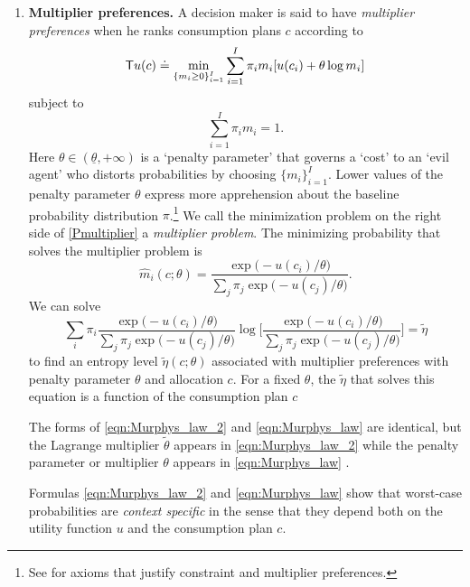 \begin{enumerate}
\item\textbf{Multiplier preferences.}  A decision maker is said to have \textit{multiplier preferences} when he ranks consumption plans $c$
according to
\begin{equation}\label{Pmultiplier}
{\sf T}u(c) \doteq \min_{\{m_i \geq 0\}_{i=1}^I}  \sum_{i=1}^I \pi_i m_i [  u(c_i) + \theta \log m_i ] \end{equation}
subject to
\[ \sum_{i=1}^I \pi_i m_i = 1 .\]
Here $\theta \in (\underline \theta, +\infty )$ is a  `penalty parameter' that governs a `cost' to an `evil agent' who distorts probabilities by
 choosing $\{m_i\}_{i=1}^I$.  %
 Lower
values of the penalty parameter $\theta$ express more apprehension about  the baseline probability distribution $\pi$.\footnote{See
\citet{CMMM2008} for axioms that justify  constraint and multiplier preferences.}
We call the minimization problem  on the right side of \eqref{Pmultiplier}   a \textit{multiplier problem}. 
The minimizing probability that solves  the multiplier problem  is
 \begin{equation}\label{eqn:Murphys_law} \hat m_i(c; \theta) = \frac{ \exp \bigl(- u(c_i)/\theta\bigr)}{\sum_j \pi_j \exp \bigl(- u(c_j)/\theta\bigr) } .\end{equation}
 We can  solve
\begin{equation}\label{eqn:entropy_grand_2}
\sum_i \pi_i \frac{ \exp \bigl(- u(c_i)/ \theta\bigr)}{\sum_j \pi_j \exp \bigl(- u(c_j)/ \theta\bigr) }
\log \biggl[\frac{ \exp \bigl(- u(c_i)/\theta\bigr)}{\sum_j \pi_j \exp \bigl(- u(c_j)/\theta\bigr) }
\biggr] = \tilde \eta  \end{equation} to find an entropy level $\tilde \eta (c; \theta)$  associated with multiplier preferences
with penalty parameter $\theta$ and allocation $c$.
For a fixed $\theta$, the $\tilde \eta$ that solves this equation is a function of the consumption
plan $c$
\begin{remark}
The forms of  \eqref{eqn:Murphys_law_2} and \eqref{eqn:Murphys_law} are identical, but the Lagrange multiplier $\tilde \theta$
 appears in \eqref{eqn:Murphys_law_2} while the penalty parameter or multiplier $\theta$ appears in \eqref{eqn:Murphys_law} . %
\end{remark}

\begin{remark}
Formulas \eqref{eqn:Murphys_law_2} and \eqref{eqn:Murphys_law} show that worst-case probabilities are
\textit{context specific} in the sense that they depend both on the utility function $u$ and the consumption plan $c$.
\end{remark}


\end{enumerate}
